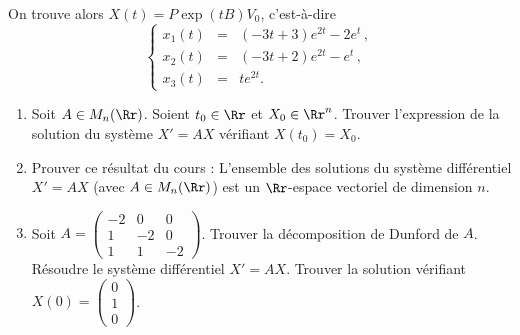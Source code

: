 \documentclass[12pt, class=report,crop=false]{standalone}
\begin{document}
\begin{exemple}
\begin{enumerate}
On trouve alors $X(t) = P\exp(tB)V_0$, c'est-à-dire
\[
\left\{
\begin{array}{rcl}
x_1(t) &=& (-3t+3)e^{2t}-2e^t\,,\\
x_2(t) &=& (-3t+2)e^{2t}-e^t\,,\\
x_3(t) &=& te^{2t}.
\end{array}
\right.
\]

\end{enumerate}
\end{exemple}


 
\begin{miniexercices}
\sauteligne
\begin{enumerate}

  \item Soit $A \in M_n(\Rr)$. Soient $t_0 \in \Rr$ et $X_0 \in \Rr^n$. Trouver l'expression de la solution du système $X'=AX$ vérifiant $X(t_0)=X_0$.
  \item Prouver ce résultat du cours : \og{}L'ensemble des solutions du système différentiel $X' = A X$ (avec $A \in M_n(\Rr)$) est un $\Rr$-espace vectoriel de dimension $n$.\fg{}
  
  \item Soit $A = \left(\begin{smallmatrix}-2&0&0\\1&-2&0\\1&1&-2\end{smallmatrix}\right)$.
  Trouver la décomposition de Dunford de $A$. Résoudre le système différentiel $X'=AX$.
  Trouver la solution vérifiant $X(0) = \left(\begin{smallmatrix}0\\1\\0\end{smallmatrix}\right)$.
  

\end{enumerate}
\end{miniexercices}
\end{document}

